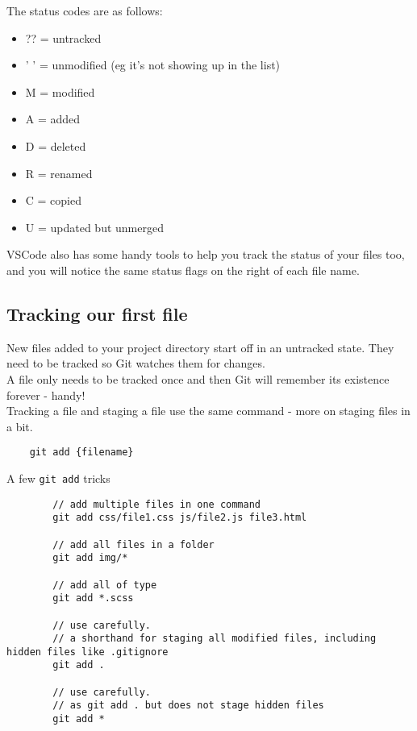 
The status codes are as follows:


\begin{itemize}
	\item ??  = untracked 	
    \item ' ' = unmodified (eg it's not showing up in the list)
    \item M   = modified
    \item A   = added
	\item D   = deleted
	\item R   = renamed
	\item C   = copied
	\item U   = updated but unmerged
\end{itemize}

VSCode also has some handy tools to help you track the status of your files too, and you will notice the same status flags on the right of each file name.
\\



\subsection{Tracking our first file}

New files added to your project directory start off in an untracked state. They need to be tracked so Git watches them for changes.
\\

A file only needs to be tracked once and then Git will remember its existence forever - handy!
\\

Tracking a file and staging a file use the same command - more on staging files in a bit.

\begin{verbatim}
    git add {filename}
\end{verbatim}

\begin{infobox}{A few \texttt{git add} tricks}
    \begin{verbatim}
        // add multiple files in one command
        git add css/file1.css js/file2.js file3.html

        // add all files in a folder
        git add img/*

        // add all of type
        git add *.scss

        // use carefully.
        // a shorthand for staging all modified files, including hidden files like .gitignore
        git add .

        // use carefully.
        // as git add . but does not stage hidden files
        git add *
    \end{verbatim}
\end{infobox}


